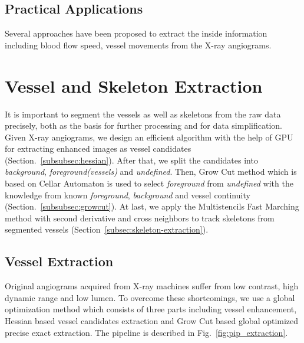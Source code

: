 \documentclass[journal]{IEEEtran}
\begin{document}
\subsection{Practical Applications}
Several approaches have been proposed to extract the inside information including blood flow speed, vessel movements from the X-ray angiograms.

\section{Vessel and Skeleton Extraction}
\label{sec:vessel-skeleton-extraction}
It is important to segment the vessels as well as skeletons from the raw data precisely, both as the basis for further processing and for data simplification. Given X-ray angiograms, we design an efficient algorithm with the help of GPU for extracting enhanced images as vessel candidates (Section.~\ref{subsubsec:hessian}). After that, we split the candidates into \textit{background}, \textit{foreground(vessels)} and \textit{undefined}. Then, Grow Cut method which is based on Cellar Automaton is used to select \textit{foreground} from \textit{undefined} with the knowledge from known \textit{foreground}, \textit{background} and vessel continuity (Section.~\ref{subsubsec:growcut}). At last, we apply the Multistencils Fast Marching method with second derivative and cross neighbors to track skeletons from segmented vessels (Section~\ref{subsec:skeleton-extraction}).

\subsection{Vessel Extraction}
\label{subsec:vessel-extraction}
Original angiograms acquired from X-ray machines suffer from low contrast, high dynamic range and low lumen. To overcome these shortcomings, we use a global optimization method which consists of three parts including vessel enhancement, Hessian based vessel candidates extraction and Grow Cut based global optimized precise exact extraction. The pipeline is described in Fig.~\ref{fig:pip_extraction}.
\end{document}
